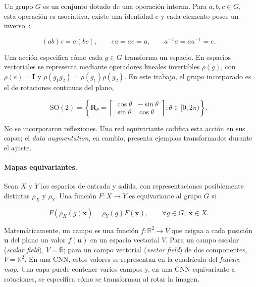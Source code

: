 Un grupo \(G\) es un conjunto dotado de una operación interna. Para
\(a,b,c\in G\), esta operación es asociativa, existe una identidad \(e\) y
cada elemento posee un inverso~\cite{hall_lie_groups_2015}:

\begin{equation}
    (ab)c=a(bc),\qquad ea=ae=a,\qquad a^{-1}a=aa^{-1}=e.
    \label{eq:axiomas-grupo}
\end{equation}

Una acción especifica cómo cada \(g\in G\) transforma un espacio. En espacios
vectoriales se representa mediante operadores lineales invertibles
\(\rho(g)\), con \(\rho(e)=\mathbf I\) y
\(\rho(g_1g_2)=\rho(g_1)\rho(g_2)\). En este trabajo, el grupo incorporado es
el de rotaciones continuas del plano,

\begin{equation}
    \mathrm{SO}(2)=\left\{\mathbf R_\theta=
    \begin{bmatrix}\cos\theta&-\sin\theta\\
                    \sin\theta& \cos\theta\end{bmatrix}:
    \theta\in[0,2\pi)\right\}.
    \label{eq:definicion-so2}
\end{equation}

No se incorporaron reflexiones. Una red equivariante codifica esta acción en
sus capas; el \emph{data augmentation}, en cambio, presenta ejemplos transformados
durante el ajuste.

\paragraph{Mapas equivariantes.}

Sean \(X\) y \(Y\) los espacios de entrada y salida, con representaciones
posiblemente distintas \(\rho_X\) y \(\rho_Y\). Una función
\(F:X\rightarrow Y\) es equivariante al grupo \(G\) si

\begin{equation}
    F\!\left(\rho_X(g)\mathbf x\right)
    =\rho_Y(g)F(\mathbf x),
    \qquad \forall g\in G,\ \mathbf x\in X.
    \label{eq:definicion-equivarianza}
\end{equation}

\begingroup{}
Matemáticamente, un campo es una función \(f:\mathbb R^2\rightarrow V\)
que asigna a cada posición \(\mathbf u\) del plano un valor
\(f(\mathbf u)\) en un espacio vectorial \(V\). Para un campo escalar (\emph{scalar field}),
\(V=\mathbb R\); para un campo vectorial (\emph{vector field}) de dos componentes,
\(V=\mathbb R^2\). En una CNN, estos valores se representan en la cuadrícula
del \emph{feature map}. Una capa puede contener varios campos y, en una
CNN equivariante a rotaciones, se especifica cómo se transforman al rotar la
imagen.
\par\endgroup

